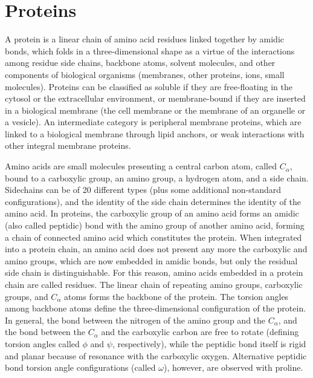 \section{Proteins}
A protein is a linear chain of amino acid residues linked together by amidic bonds, which folds in a three-dimensional shape as a virtue of the interactions among residue side chains, backbone atoms, solvent molecules, and other components of biological organisms (membranes, other proteins, ions, small molecules).
Proteins can be classified as soluble if they are free-floating in the cytosol or the extracellular environment, or membrane-bound if they are inserted in a biological membrane (the cell membrane or the membrane of an organelle or a vesicle).
An intermediate category is peripheral membrane proteins, which are linked to a biological membrane through lipid anchors, or weak interactions with other integral membrane proteins.

Amino acids are small molecules presenting a central carbon atom, called $C_\alpha$, bound to a carboxylic group, an amino group, a hydrogen atom, and a side chain.
Sidechains can be of \num{20} different types (plus some additional non-standard configurations), and the identity of the side chain determines the identity of the amino acid.
In proteins, the carboxylic group of an amino acid forms an amidic (also called peptidic) bond with the amino group of another amino acid, forming a chain of connected amino acid which constitutes the protein.
When integrated into a protein chain, an amino acid does not present any more the carboxylic and amino groups, which are now embedded in amidic bonds, but only the residual side chain is distinguishable.
For this reason, amino acids embedded in a protein chain are called residues.
The linear chain of repeating amino groups, carboxylic groups, and $C_\alpha$ atoms forms the backbone of the protein.
The torsion angles among backbone atoms define the three-dimensional configuration of the protein.
In general, the bond between the nitrogen of the amino group and the $C_\alpha$, and the bond between the $C_\alpha$ and the carboxylic carbon are free to rotate (defining torsion angles called $\phi$ and $\psi$, respectively), while the peptidic bond itself is rigid and planar because of resonance with the carboxylic oxygen.
Alternative peptidic bond torsion angle configurations (called $\omega$), however, are observed with proline.

